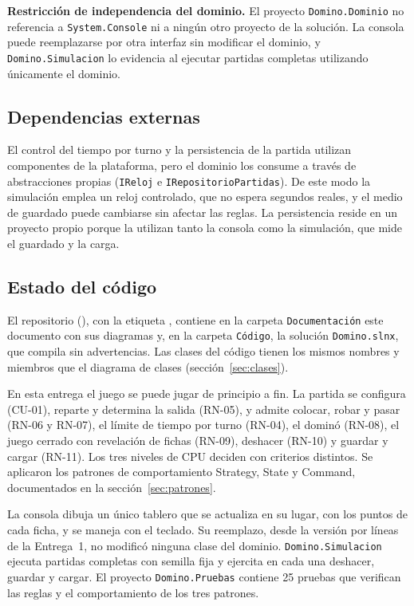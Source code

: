 \begin{nota}
\textbf{Restricción de independencia del dominio.} El proyecto \texttt{Domino.Dominio} no referencia a \texttt{System.Console} ni a ningún otro proyecto de la solución. La consola puede reemplazarse por otra interfaz sin modificar el dominio, y \texttt{Domino.Simulacion} lo evidencia al ejecutar partidas completas utilizando únicamente el dominio.
\end{nota}

\subsection{Dependencias externas}

El control del tiempo por turno y la persistencia de la partida utilizan componentes de la plataforma, pero el dominio los consume a través de abstracciones propias (\texttt{IReloj} e \texttt{IRepositorioPartidas}). De este modo la simulación emplea un reloj controlado, que no espera segundos reales, y el medio de guardado puede cambiarse sin afectar las reglas. La persistencia reside en un proyecto propio porque la utilizan tanto la consola como la simulación, que mide el guardado y la carga.

\subsection{Estado del código}

El repositorio (\Repositorio), con la etiqueta \EtiquetaRepo, contiene en la carpeta \texttt{Documentación} este documento con sus diagramas y, en la carpeta \texttt{Código}, la solución \texttt{Domino.slnx}, que compila sin advertencias. Las clases del código tienen los mismos nombres y miembros que el diagrama de clases (sección~\ref{sec:clases}).

En esta entrega el juego se puede jugar de principio a fin. La partida se configura (CU-01), reparte y determina la salida (RN-05), y admite colocar, robar y pasar (RN-06 y RN-07), el límite de tiempo por turno (RN-04), el dominó (RN-08), el juego cerrado con revelación de fichas (RN-09), deshacer (RN-10) y guardar y cargar (RN-11). Los tres niveles de CPU deciden con criterios distintos. Se aplicaron los patrones de comportamiento Strategy, State y Command, documentados en la sección~\ref{sec:patrones}.

La consola dibuja un único tablero que se actualiza en su lugar, con los puntos de cada ficha, y se maneja con el teclado. Su reemplazo, desde la versión por líneas de la Entrega~1, no modificó ninguna clase del dominio. \texttt{Domino.Simulacion} ejecuta partidas completas con semilla fija y ejercita en cada una deshacer, guardar y cargar. El proyecto \texttt{Domino.Pruebas} contiene 25 pruebas que verifican las reglas y el comportamiento de los tres patrones.

